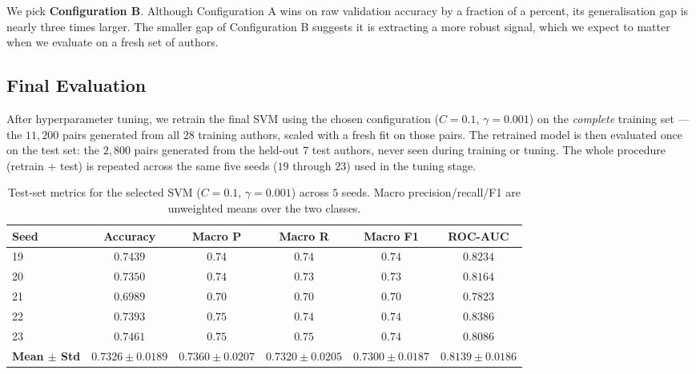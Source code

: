 \documentclass[11pt]{article}
\newcommand{\code}[1]{%
  \tcbox[on line, colback=codebg, colframe=codebg,
         boxrule=0pt, arc=2pt, left=2pt, right=2pt, top=0pt, bottom=0pt]
        {\ttfamily\small #1}}
\begin{document}
\noindent We pick \textbf{Configuration B}. Although Configuration A wins on
raw validation accuracy by a fraction of a percent, its generalisation gap is
nearly three times larger. The smaller gap of Configuration B suggests it is
extracting a more robust signal, which we expect to matter when we evaluate on
a fresh set of authors.

\subsection{Final Evaluation}

After hyperparameter tuning, we retrain the final SVM using the chosen
configuration ($C{=}0.1$, $\gamma{=}0.001$) on the \emph{complete} training
set --- the $11{,}200$ pairs generated from all $28$ training authors,
scaled with a fresh \code{StandardScaler} fit on those pairs. The retrained
model is then evaluated once on the test set: the $2{,}800$ pairs generated
from the held-out $7$ test authors, never seen during training or tuning.
The whole procedure (retrain + test) is repeated across the same five seeds
($19$ through $23$) used in the tuning stage.

\begin{table}[H]
  \centering
  \small
  \caption{Test-set metrics for the selected SVM ($C=0.1$, $\gamma=0.001$)
  across $5$ seeds. Macro precision/recall/F1 are unweighted means over the
  two classes.}
  \label{tab:finaleval}
  \begin{tabular}{@{}lccccc@{}}
    \toprule
    \textbf{Seed} & \textbf{Accuracy} & \textbf{Macro P}
        & \textbf{Macro R} & \textbf{Macro F1} & \textbf{ROC-AUC} \\
    \midrule
    19 & $0.7439$ & $0.74$ & $0.74$ & $0.74$ & $0.8234$ \\
    20 & $0.7350$ & $0.74$ & $0.73$ & $0.73$ & $0.8164$ \\
    21 & $0.6989$ & $0.70$ & $0.70$ & $0.70$ & $0.7823$ \\
    22 & $0.7393$ & $0.75$ & $0.74$ & $0.74$ & $0.8386$ \\
    23 & $0.7461$ & $0.75$ & $0.75$ & $0.74$ & $0.8086$ \\
    \midrule
    \textbf{Mean $\pm$ Std} & \textbf{$0.7326\pm0.0189$}
        & \textbf{$0.7360\pm0.0207$} & \textbf{$0.7320\pm0.0205$}
        & \textbf{$0.7300\pm0.0187$} & \textbf{$0.8139\pm0.0186$} \\
    \bottomrule
  \end{tabular}
\end{table}
\end{document}
